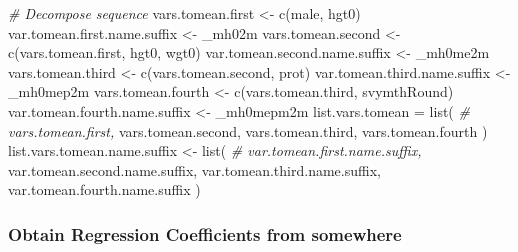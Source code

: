 \documentclass[
]{book}
\newenvironment{Shaded}{\begin{snugshade}}{\end{snugshade}}
\newcommand{\CommentTok}[1]{\textcolor[rgb]{0.56,0.35,0.01}{\textit{#1}}}
\newcommand{\FunctionTok}[1]{\textcolor[rgb]{0.00,0.00,0.00}{#1}}
\newcommand{\NormalTok}[1]{#1}
\newcommand{\OtherTok}[1]{\textcolor[rgb]{0.56,0.35,0.01}{#1}}
\newcommand{\StringTok}[1]{\textcolor[rgb]{0.31,0.60,0.02}{#1}}
\begin{document}
\begin{Shaded}
\begin{Highlighting}[]
\CommentTok{\# Decompose sequence}
\NormalTok{vars.tomean.first }\OtherTok{\textless{}{-}} \FunctionTok{c}\NormalTok{(}\StringTok{\textquotesingle{}male\textquotesingle{}}\NormalTok{, }\StringTok{\textquotesingle{}hgt0\textquotesingle{}}\NormalTok{)}
\NormalTok{var.tomean.first.name.suffix }\OtherTok{\textless{}{-}} \StringTok{\textquotesingle{}\_mh02m\textquotesingle{}}
\NormalTok{vars.tomean.second }\OtherTok{\textless{}{-}} \FunctionTok{c}\NormalTok{(vars.tomean.first, }\StringTok{\textquotesingle{}hgt0\textquotesingle{}}\NormalTok{, }\StringTok{\textquotesingle{}wgt0\textquotesingle{}}\NormalTok{)}
\NormalTok{var.tomean.second.name.suffix }\OtherTok{\textless{}{-}} \StringTok{\textquotesingle{}\_mh0me2m\textquotesingle{}}
\NormalTok{vars.tomean.third }\OtherTok{\textless{}{-}} \FunctionTok{c}\NormalTok{(vars.tomean.second, }\StringTok{\textquotesingle{}prot\textquotesingle{}}\NormalTok{)}
\NormalTok{var.tomean.third.name.suffix }\OtherTok{\textless{}{-}} \StringTok{\textquotesingle{}\_mh0mep2m\textquotesingle{}}
\NormalTok{vars.tomean.fourth }\OtherTok{\textless{}{-}} \FunctionTok{c}\NormalTok{(vars.tomean.third, }\StringTok{\textquotesingle{}svymthRound\textquotesingle{}}\NormalTok{)}
\NormalTok{var.tomean.fourth.name.suffix }\OtherTok{\textless{}{-}} \StringTok{\textquotesingle{}\_mh0mepm2m\textquotesingle{}}
\NormalTok{list.vars.tomean }\OtherTok{=} \FunctionTok{list}\NormalTok{(}
\CommentTok{\#                         vars.tomean.first,}
\NormalTok{                        vars.tomean.second,}
\NormalTok{                        vars.tomean.third,}
\NormalTok{                        vars.tomean.fourth}
\NormalTok{                        )}
\NormalTok{list.vars.tomean.name.suffix }\OtherTok{\textless{}{-}} \FunctionTok{list}\NormalTok{(}
\CommentTok{\#                                     var.tomean.first.name.suffix,}
\NormalTok{                                     var.tomean.second.name.suffix,}
\NormalTok{                                     var.tomean.third.name.suffix,}
\NormalTok{                                     var.tomean.fourth.name.suffix}
\NormalTok{                                    )}
\end{Highlighting}
\end{Shaded}

\hypertarget{obtain-regression-coefficients-from-somewhere}{%
\subsubsection{Obtain Regression Coefficients from somewhere}\label{obtain-regression-coefficients-from-somewhere}}
\end{document}
